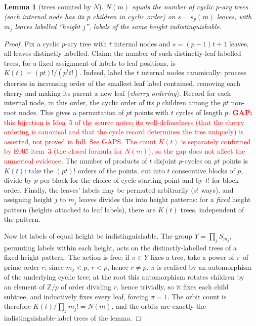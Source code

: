 \documentclass[11pt]{amsart}
\newtheorem{lemma}[theorem]{Lemma}
\theoremstyle{definition}
\theoremstyle{remark}
\newcommand{\GAP}[1]{\textcolor{red}{\textbf{GAP: }#1}}
\newcommand{\Z}{\mathbb Z}
\newcommand{\Nn}{N}
\newcommand{\sd}{s_p}
\newcommand{\Kc}{K}
\begin{document}
\begin{lemma}[trees counted by $\Nn$]\label{lem:trees}
$\Nn(m)$ equals the number of cyclic $p$-ary trees (each internal node has
its $p$ children in cyclic order) on $s=\sd(m)$ leaves, with $m_j$ leaves
labelled ``height $j$'', labels of the same height indistinguishable.
\end{lemma}
\begin{proof}
Fix a cyclic $p$-ary tree with $t$ internal nodes and $s=(p-1)t+1$ leaves,
all leaves distinctly labelled. Claim: the number of such
distinctly-leaf-labelled trees, for a fixed assignment of labels to leaf
positions, is $\Kc(t)=(pt)!/(p^tt!)$. Indeed, label the $t$ internal nodes
canonically: process cherries in increasing order of the smallest leaf label
contained, removing each cherry and making its parent a new leaf
(\emph{cherry ordering}). Record for each internal node, in this order, the
cyclic order of its $p$ children among the $pt$ non-root nodes. This gives a
permutation of $pt$ points with $t$ cycles of length $p$. \GAP{this bijection
is Idea~5 of the source notes; its well-definedness (that the cherry ordering
is canonical and that the cycle record determines the tree uniquely) is
asserted, not proved in full. See GAPS. The count $\Kc(t)$ is separately
confirmed by E005 item~3 (the closed formula for $\Nn(m)$), so the gap does
not affect the numerical evidence.} The number of products of $t$ disjoint
$p$-cycles on $pt$ points is $\Kc(t)$: take the $(pt)!$ orders of the points,
cut into $t$ consecutive blocks of $p$, divide by $p$ per block for the
choice of cycle starting point and by $t!$ for block order. Finally, the
leaves' labels may be permuted arbitrarily ($s!$ ways), and assigning height
$j$ to $m_j$ leaves divides this into height patterns: for a
\emph{fixed} height pattern (heights attached to leaf labels), there are
$\Kc(t)$ trees, independent of the pattern.

Now let labels of equal height be indistinguishable. The group
$Y=\prod_jS_{m_j}$, permuting labels within each height, acts on the
distinctly-labelled trees of a fixed height pattern. The action is free: if
$\pi\in Y$ fixes a tree, take a power of $\pi$ of prime order $r$; since
$m_j<p$, $r<p$, hence $r\ne p$. $\pi$ is realised by an automorphism of the
underlying cyclic tree; at the root this automorphism rotates children by an
element of $\Z/p$ of order dividing $r$, hence trivially, so it fixes each
child subtree, and inductively fixes every leaf, forcing $\pi=1$. The orbit
count is therefore $\Kc(t)/\prod_jm_j!=\Nn(m)$, and the orbits are exactly
the indistinguishable-label trees of the lemma.
\end{proof}
\end{document}
